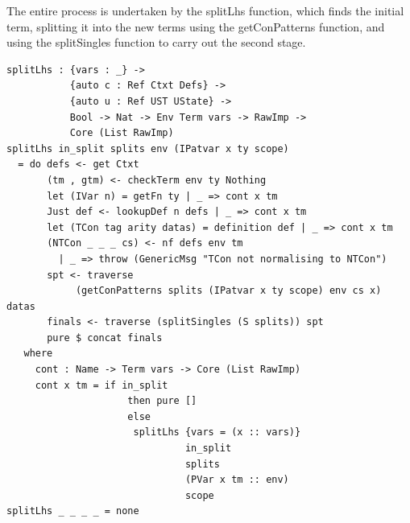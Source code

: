 \documentclass[a4paper]{article}
\begin{document}
The entire process is undertaken by the splitLhs function, which finds the
initial term, splitting it into the new terms using the getConPatterns function,
and using the splitSingles function to carry out the second stage. 

\begin{center}
  \begin{verbatim}
splitLhs : {vars : _} ->
           {auto c : Ref Ctxt Defs} -> 
           {auto u : Ref UST UState} ->
           Bool -> Nat -> Env Term vars -> RawImp -> 
           Core (List RawImp)
splitLhs in_split splits env (IPatvar x ty scope)
  = do defs <- get Ctxt
       (tm , gtm) <- checkTerm env ty Nothing  
       let (IVar n) = getFn ty | _ => cont x tm
       Just def <- lookupDef n defs | _ => cont x tm 
       let (TCon tag arity datas) = definition def | _ => cont x tm
       (NTCon _ _ _ cs) <- nf defs env tm
         | _ => throw (GenericMsg "TCon not normalising to NTCon")
       spt <- traverse 
            (getConPatterns splits (IPatvar x ty scope) env cs x) datas
       finals <- traverse (splitSingles (S splits)) spt
       pure $ concat finals
   where 
     cont : Name -> Term vars -> Core (List RawImp)
     cont x tm = if in_split 
                     then pure []
                     else 
                      splitLhs {vars = (x :: vars)}
                               in_split
                               splits
                               (PVar x tm :: env)
                               scope
splitLhs _ _ _ _ = none
  \end{verbatim}
\end{center}
\end{document}
